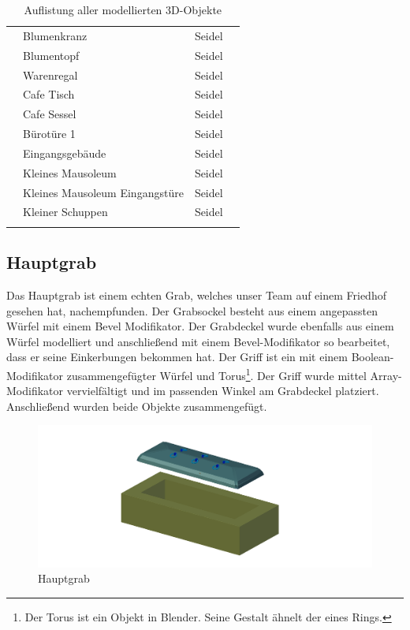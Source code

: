 \begin{longtable}{|p{3.4cm}|p{3.4cm}|p{3.4cm}|p{3.4cm}|}
    & Blumenkranz & Seidel & \\
    & Blumentopf & Seidel & \\
    & Warenregal & Seidel & \\
    & Cafe Tisch & Seidel & \\
    & Cafe Sessel & Seidel & \\
    & Bürotüre 1 & Seidel & \\
    & Eingangsgebäude & Seidel & \\

    & Kleines Mausoleum & Seidel & \\
    & Kleines Mausoleum Eingangstüre & Seidel & \\

    & Kleiner Schuppen & Seidel & \\
    \hline
    \caption{Auflistung aller modellierten 3D-Objekte}
\end{longtable}

\subsection{Hauptgrab}
\label{Hauptgrab:Heading}
Das Hauptgrab ist einem echten Grab, welches unser Team auf einem Friedhof gesehen hat, nachempfunden. Der Grabsockel besteht aus einem angepassten Würfel
mit einem Bevel Modifikator. Der Grabdeckel wurde ebenfalls aus einem Würfel modelliert und anschließend mit einem Bevel-Modifikator so bearbeitet, dass
er seine Einkerbungen bekommen hat. Der Griff ist ein mit einem Boolean-Modifikator zusammengefügter Würfel und Torus\footnote{Der Torus ist ein Objekt in Blender. Seine Gestalt ähnelt der eines Rings.}.
Der Griff wurde mittel Array-Modifikator vervielfältigt und im passenden Winkel am Grabdeckel platziert. Anschließend wurden beide Objekte zusammengefügt.

\raggedbottom
\begin{figure}[H]
    \centering
    \includegraphics[width=.8\textwidth]{images/Hauptgrab_Grab.png}
    \caption{Hauptgrab}
    \label{Hauptgrab:Image1}
\end{figure}

